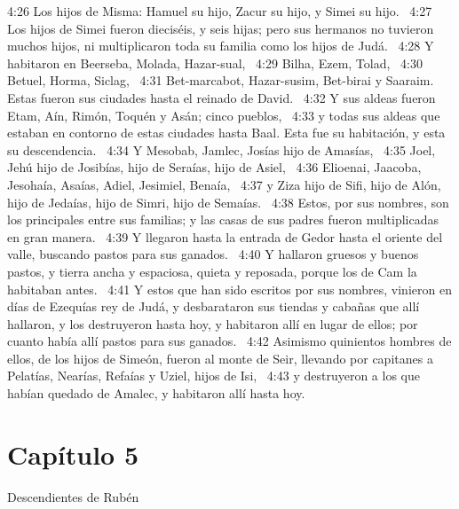 4:26 Los hijos de Misma: Hamuel su hijo, Zacur su hijo, y Simei su hijo.  
4:27 Los hijos de Simei fueron dieciséis, y seis hijas; pero sus hermanos no tuvieron muchos hijos, ni multiplicaron toda su familia como los hijos de Judá.  
4:28 Y habitaron en Beerseba, Molada, Hazar-sual,  
4:29 Bilha, Ezem, Tolad,  
4:30 Betuel, Horma, Siclag,  
4:31 Bet-marcabot, Hazar-susim, Bet-birai y Saaraim. Estas fueron sus ciudades hasta el reinado de David.  
4:32 Y sus aldeas fueron Etam, Aín, Rimón, Toquén y Asán; cinco pueblos,  
4:33 y todas sus aldeas que estaban en contorno de estas ciudades hasta Baal. Esta fue su habitación, y esta su descendencia.  
4:34 Y Mesobab, Jamlec, Josías hijo de Amasías,  
4:35 Joel, Jehú hijo de Josibías, hijo de Seraías, hijo de Asiel,  
4:36 Elioenai, Jaacoba, Jesohaía, Asaías, Adiel, Jesimiel, Benaía,  
4:37 y Ziza hijo de Sifi, hijo de Alón, hijo de Jedaías, hijo de Simri, hijo de Semaías.  
4:38 Estos, por sus nombres, son los principales entre sus familias; y las casas de sus padres fueron multiplicadas en gran manera.  
4:39 Y llegaron hasta la entrada de Gedor hasta el oriente del valle, buscando pastos para sus ganados.  
4:40 Y hallaron gruesos y buenos pastos, y tierra ancha y espaciosa, quieta y reposada, porque los de Cam la habitaban antes.  
4:41 Y estos que han sido escritos por sus nombres, vinieron en días de Ezequías rey de Judá, y desbarataron sus tiendas y cabañas que allí hallaron, y los destruyeron hasta hoy, y habitaron allí en lugar de ellos; por cuanto había allí pastos para sus ganados.  
4:42 Asimismo quinientos hombres de ellos, de los hijos de Simeón, fueron al monte de Seir, llevando por capitanes a Pelatías, Nearías, Refaías y Uziel, hijos de Isi,  
4:43 y destruyeron a los que habían quedado de Amalec, y habitaron allí hasta hoy.  
\section*{Capítulo 5 }
Descendientes de Rubén  

